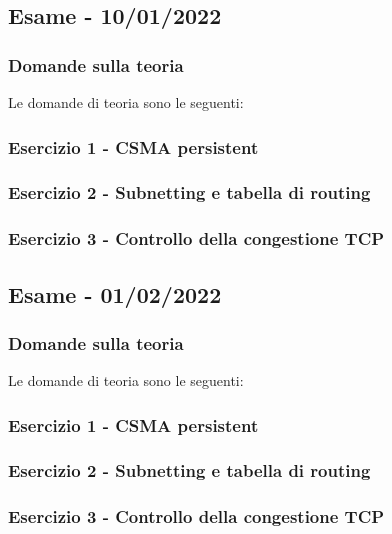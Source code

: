 \documentclass[a4paper]{article}
\begin{document}
	\subsection[\textbf{Esame - 10/01/2022}]{Esame - 10/01/2022}
	
	\subsubsection{Domande sulla teoria}
	Le domande di teoria sono le seguenti:
	
	\subsubsection{Esercizio 1 - CSMA persistent}
	
	\subsubsection{Esercizio 2 - Subnetting e tabella di routing}
	
	\subsubsection{Esercizio 3 - Controllo della congestione TCP}
	
	\newpage

	\subsection[\textbf{Esame - 01/02/2022}]{Esame - 01/02/2022}
	
	\subsubsection{Domande sulla teoria}
	Le domande di teoria sono le seguenti:
	
	\subsubsection{Esercizio 1 - CSMA persistent}
	
	\subsubsection{Esercizio 2 - Subnetting e tabella di routing}
	
	\subsubsection{Esercizio 3 - Controllo della congestione TCP}
	
\end{document}
